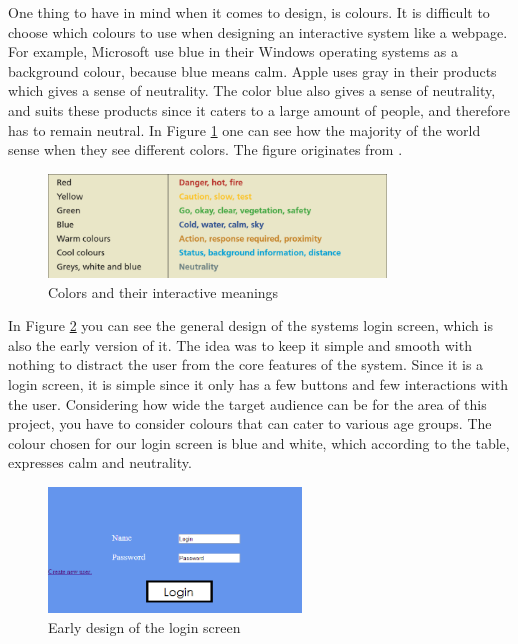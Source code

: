 One thing to have in mind when it comes to design, is colours. It is difficult to choose which colours to use when designing an interactive system like a webpage. For example, Microsoft use blue in their Windows operating systems as a background colour, because blue means calm. Apple uses gray in their products which gives a sense of neutrality. The color blue also gives a sense of neutrality, and suits these products since it caters to a large amount of people, and therefore has to remain neutral. In Figure \ref{Colors} one can see how the majority of the world sense when they see different colors. The figure originates from \cite{DEBBook}.

\begin{figure}[htb]
\centering
\includegraphics[width=0.8\textwidth]{Images/Colors.png}
\caption{Colors and their interactive meanings \cite{DEBBook}}
\label{Colors}
\end{figure}

In Figure \ref{Login} you can see the general design of the systems login screen, which is also the early version of it. The idea was to keep it simple and smooth with nothing to distract the user from the core features of the system. Since it is a login screen, it is simple since it only has a few buttons and few interactions with the user. Considering how wide the target audience can be for the area of this project, you have to consider colours that can cater to various age groups. The colour chosen for our login screen is blue and white, which according to the table, expresses calm and neutrality.

\begin{figure}[htb]
\centering
\includegraphics[width=0.6\textwidth]{Images/Login.png}
\caption{Early design of the login screen}
\label{Login}
\end{figure}

